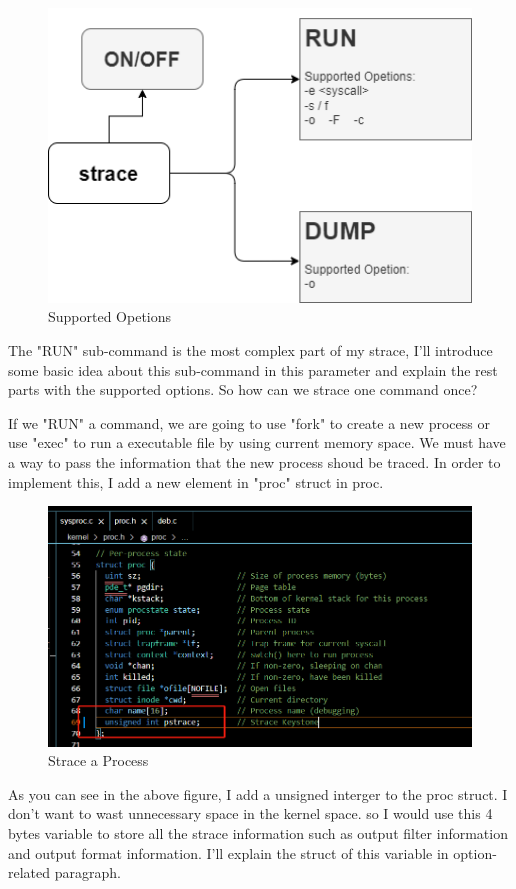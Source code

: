 \documentclass[11pt,oneside,a4paper]{article}
\begin{document}
\begin{figure}[H]
    \includegraphics[width=4.75in]{1-14.png}
    \centering
    \caption{Supported Opetions}
\end{figure}

The "RUN" sub-command is the most complex part of my strace, I'll introduce some 
basic idea about this sub-command in this parameter and explain the rest parts with
the supported options. So how can we strace one command once?

If we "RUN" a command, we are going to use "fork" to create a new process or use 
"exec" to run a executable file by using current memory space. We must have a way to 
pass the information that the new process shoud be traced. In order to implement this,
I add a new element in "proc" struct in proc.

\begin{figure}[H]
    \includegraphics[width=4.75in]{1-15.png}
    \centering
    \caption{Strace a Process}
\end{figure}

As you can see in the above figure, I add a unsigned interger to the proc struct.
I don't want to wast unnecessary space in the kernel space.
so I would use this 4 bytes variable to store all the strace information such as 
output filter information and output format information. I'll explain the struct of
this variable in option-related paragraph.
\end{document}
